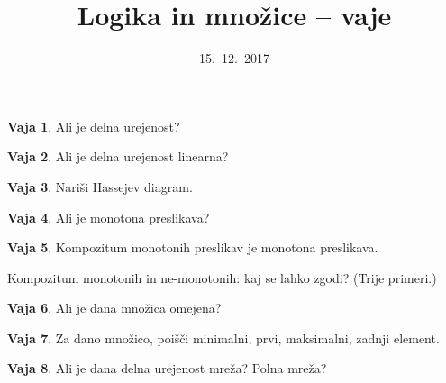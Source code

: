 \documentclass{article}
\theoremstyle{definition}
\newtheorem{vaja}{Vaja}
\begin{document}
\title{Logika in množice -- vaje}
\date{15.~12.~2017}
\maketitle

\begin{vaja}
  Ali je delna urejenost?
\end{vaja}

\begin{vaja}
  Ali je delna urejenost linearna?
\end{vaja}

\begin{vaja}
  Nariši Hassejev diagram.
\end{vaja}

\begin{vaja}
  Ali je monotona preslikava?
\end{vaja}

\begin{vaja}
  Kompozitum monotonih preslikav je monotona preslikava.

  Kompozitum monotonih in ne-monotonih: kaj se lahko zgodi? (Trije primeri.)
\end{vaja}

\begin{vaja}
  Ali je dana množica omejena?
\end{vaja}

\begin{vaja}
  Za dano množico, poišči minimalni, prvi, maksimalni, zadnji element.
\end{vaja}

\begin{vaja}
  Ali je dana delna urejenost mreža? Polna mreža?
\end{vaja}
\end{document}
